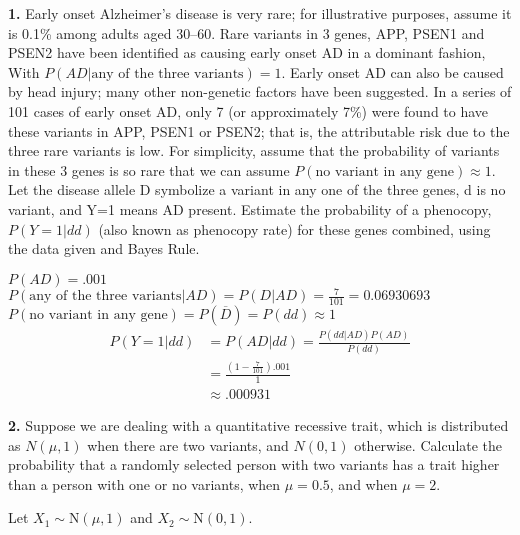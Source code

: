 \documentclass{essay}
\begin{document}
\sffamily


\begin{essaystyle}

\vspace{.5em}

\textbf{1.} Early onset Alzheimer’s disease is very rare; for illustrative
purposes, assume it is 0.1\% among adults aged 30--60. Rare variants in 3 genes,
APP, PSEN1 and PSEN2 have been identified as causing early onset AD in a
dominant fashion, With $P(AD | \textrm{any of the three variants}) = 1$. Early onset AD
can also be caused by head injury; many other non-genetic factors have been
suggested. In a series of 101 cases of early onset AD, only 7 (or approximately
7\%) were found to have these variants in APP, PSEN1 or PSEN2; that is, the
attributable risk due to the three rare variants is low. For simplicity, assume
that the probability of variants in these 3 genes is so rare that we can assume
$P(\textrm{no variant in any gene}) \approx 1$. Let the disease allele D symbolize a
variant in any one of the three genes, d is no variant, and Y=1 means AD
present. Estimate the probability of a phenocopy, $P(Y=1 | dd)$ (also known as
phenocopy rate) for these genes combined, using the data given and Bayes Rule.


$P(AD) = .001$ \\
$P(\textrm{any of the three variants} | AD) = P(D|AD) = \frac{7}{101} = 0.06930693$ \\
$P(\textrm{no variant in any gene}) = P(\overline{D}) = P(dd) \approx 1$\\

\begin{align}
  P(Y=1 | dd) &= P(AD | dd) = \frac{P(dd|AD)P(AD)}{P(dd)} \\
  &= \frac{(1-\frac{7}{101}).001}{1} \\
  &\approx .000931
\end{align}


\textbf{2.} Suppose we are dealing with a quantitative recessive trait, which
is distributed as $N(\mu,1)$ when there are two variants, and $N(0,1)$ otherwise.
Calculate the probability that a randomly selected person with two variants has
a trait higher than a person with one or no variants, when $\mu=0.5$, and when
$\mu=2$.

Let $X_{1} \sim \mathrm{N}(\mu,1)$ and $X_{2} \sim \mathrm{N}(0,1)$.


\end{essaystyle}
\end{document}
